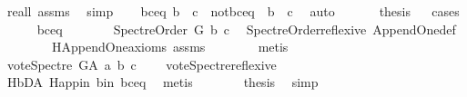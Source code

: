 \begin{isabellebody}
\ re{\isacharunderscore}{\kern0pt}all\ assms{\isacharparenleft}{\kern0pt}{}{\isacharparenright}{\kern0pt}\ \isamarkupfalse%
\ simp\isanewline
\ \ \isamarkupfalse%
\ {\isacharparenleft}{\kern0pt}b{\isacharunderscore}{\kern0pt}c{\isacharunderscore}{\kern0pt}eq{\isacharparenright}{\kern0pt}\ {\isachardoublequoteopen}b\ {\isacharequal}{\kern0pt}\ c{\isachardoublequoteclose}\ {\isacharbar}{\kern0pt}\ {\isacharparenleft}{\kern0pt}not{\isacharunderscore}{\kern0pt}b{\isacharunderscore}{\kern0pt}c{\isacharunderscore}{\kern0pt}eq{\isacharparenright}{\kern0pt}\ {\isachardoublequoteopen}{\isasymnot}\ b\ {\isacharequal}{\kern0pt}\ c{\isachardoublequoteclose}\ \isamarkupfalse%
\ auto\ \isanewline
\ \ \isamarkupfalse%
\ \isamarkupfalse%
\ {\isacharquery}{\kern0pt}thesis\isanewline
\ \ \isamarkupfalse%
{\isacharparenleft}{\kern0pt}cases{\isacharparenright}{\kern0pt}\isanewline
\ \ \ \ \isamarkupfalse%
\ b{\isacharunderscore}{\kern0pt}c{\isacharunderscore}{\kern0pt}eq\isanewline
\ \ \ \ \isamarkupfalse%
\ \isamarkupfalse%
\ {\isachardoublequoteopen}Spectre{\isacharunderscore}{\kern0pt}Order\ G\ b\ c{\isachardoublequoteclose}\ \isamarkupfalse%
\ Spectre{\isacharunderscore}{\kern0pt}Order{\isacharunderscore}{\kern0pt}reflexive\ Append{\isacharunderscore}{\kern0pt}One{\isacharunderscore}{\kern0pt}def\isanewline
\ \ \ \ \ \ \ \ H{\isachardot}{\kern0pt}Append{\isacharunderscore}{\kern0pt}One{\isacharunderscore}{\kern0pt}axioms\ assms\isanewline
\ \ \ \ \ \ \isamarkupfalse%
\ metis\isanewline
\ \ \ \ \isamarkupfalse%
\ \isamarkupfalse%
\ {\isachardoublequoteopen}vote{\isacharunderscore}{\kern0pt}Spectre\ G{\isacharunderscore}{\kern0pt}A\ a\ b\ c\ {\isacharequal}{\kern0pt}\ {}{\isachardoublequoteclose}\ \isamarkupfalse%
\ vote{\isacharunderscore}{\kern0pt}Spectre{\isacharunderscore}{\kern0pt}reflexive\ \isanewline
\ \ \ \ \ \ \isamarkupfalse%
\ H{\isachardot}{\kern0pt}bD{\isacharunderscore}{\kern0pt}A\ H{\isachardot}{\kern0pt}app{\isacharunderscore}{\kern0pt}in\ b{\isacharunderscore}{\kern0pt}in\ b{\isacharunderscore}{\kern0pt}c{\isacharunderscore}{\kern0pt}eq\ \isamarkupfalse%
\ metis\isanewline
\ \ \ \ \isamarkupfalse%
\ \isamarkupfalse%
\ {\isacharquery}{\kern0pt}thesis\ \isamarkupfalse%
\ simp\isanewline
\ \ \isamarkupfalse%

\end{isabellebody}
